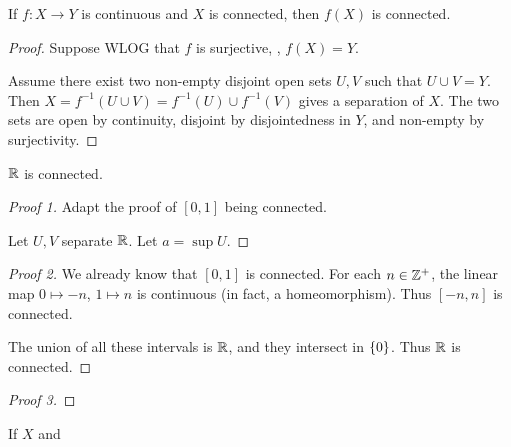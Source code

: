 \begin{lemma}
    If $f\colon X \to Y$ is continuous and $X$ is connected, then
    $f(X)$ is connected.
\end{lemma}
\begin{proof}
    Suppose WLOG that $f$ is surjective, \ie, $f(X) = Y$.

    Assume there exist two non-empty disjoint open sets $U, V$ such that
    $U \cup V = Y$.
    Then $X = f^{-1}(U \cup V) = f^{-1}(U) \cup f^{-1}(V)$ gives
    a separation of $X$.
    The two sets are open by continuity, disjoint by disjointedness in $Y$,
    and non-empty by surjectivity.
\end{proof}

\begin{proposition}
    $\mathbb{R}$ is connected.
\end{proposition}
\begin{proof}[Proof 1]
    Adapt the proof of $[0, 1]$ being connected.

    Let $U, V$ separate $\mathbb{R}$.
    Let $a = \sup U$.
\end{proof}
\begin{proof}[Proof 2]
    We already know that $[0, 1]$ is connected.
    For each $n \in \mathbb{Z}^+$, the linear map $0 \mapsto -n$, $1 \mapsto n$
    is continuous (in fact, a homeomorphism).
    Thus $[-n, n]$ is connected.

    The union of all these intervals is $\mathbb{R}$, and they intersect in
    $\{0\}$.
    Thus $\mathbb{R}$ is connected.
\end{proof}
\begin{proof}[Proof 3]
    
\end{proof}

\begin{lemma}
    If $X$ and 
\end{lemma}
